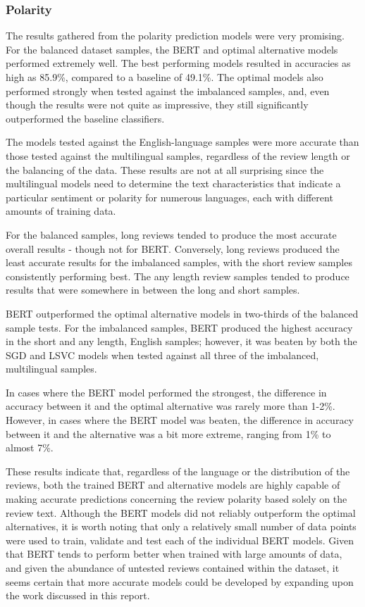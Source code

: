 \subsubsection{Polarity}

The results gathered from the polarity prediction models were very promising. For the balanced dataset samples, the BERT and optimal alternative models performed extremely well. The best performing models resulted in accuracies as high as 85.9\%, compared to a baseline of 49.1\%. The optimal models also performed strongly when tested against the imbalanced samples, and, even though the results were not quite as impressive, they still significantly outperformed the baseline classifiers.

The models tested against the English-language samples were more accurate than those tested against the multilingual samples, regardless of the review length or the balancing of the data. These results are not at all surprising since the multilingual models need to determine the text characteristics that indicate a particular sentiment or polarity for numerous languages, each with different amounts of training data.

For the balanced samples, long reviews tended to produce the most accurate overall results - though not for BERT. Conversely, long reviews produced the least accurate results for the imbalanced samples, with the short review samples consistently performing best. The any length review samples tended to produce results that were somewhere in between the long and short samples.

BERT outperformed the optimal alternative models in two-thirds of the balanced sample tests. For the imbalanced samples, BERT produced the highest accuracy in the short and any length, English samples; however, it was beaten by both the SGD and LSVC models when tested against all three of the imbalanced, multilingual samples.

In cases where the BERT model performed the strongest, the difference in accuracy between it and the optimal alternative was rarely more than 1-2\%. However, in cases where the BERT model was beaten, the difference in accuracy between it and the alternative was a bit more extreme, ranging from 1\% to almost 7\%.

These results indicate that, regardless of the language or the distribution of the reviews, both the trained BERT and alternative models are highly capable of making accurate predictions concerning the review polarity based solely on the review text. Although the BERT models did not reliably outperform the optimal alternatives, it is worth noting that only a relatively small number of data points were used to train, validate and test each of the individual BERT models. Given that BERT tends to perform better when trained with large amounts of data, and given the abundance of untested reviews contained within the dataset, it seems certain that more accurate models could be developed by expanding upon the work discussed in this report.

